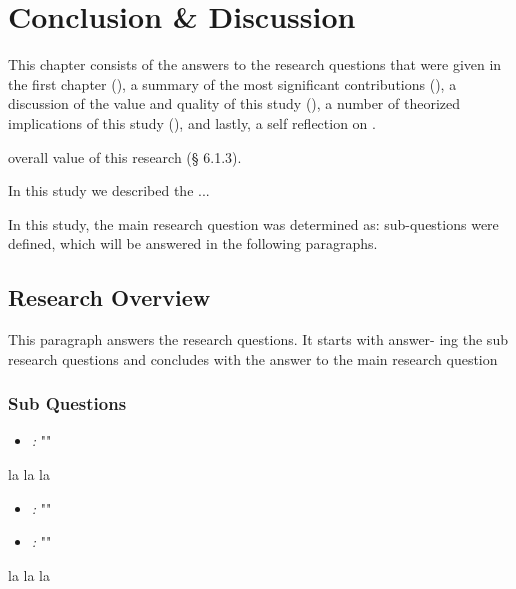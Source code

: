 \chapter{Conclusion \& Discussion}
\label{chap:conclusion}

This chapter consists of the answers to the research
questions that were given in the first chapter (), 
a summary of the most significant contributions (), 
a discussion of the value and quality of this study (),
a number of theorized implications of this study (),
and lastly, a self reflection on .


overall value of this research (§ 6.1.3).


In this study we described the ...

In this study, the main research question was determined as: \myMainRQ
sub-questions were defined, which will be answered in the following paragraphs.


\section{Research Overview}
\label{sec:answers}

This paragraph answers the research questions. 
It starts with answer-
ing the sub research questions and concludes with the answer to the
main research question

\subsection*{Sub Questions}

\begin{itemize}[ ]
  \item \emph{\mySubRQOneTitle:} "\mySubRQOne"
\end{itemize}

la la la

\begin{itemize}[ ]
  \item \emph{\mySubRQTwoTitle:} "\mySubRQTwo"
\end{itemize}


\begin{itemize}[ ]
  \item \emph{\mySubRQThreeTitle:}  "\mySubRQThree"
\end{itemize}

la la la

